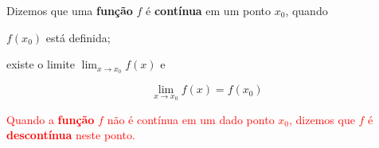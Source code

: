 \cleardoublepage\documentclass[../main.tex]{subfiles}
\begin{document}
\begin{framed}\begin{definition}
Dizemos que uma {\bf função} $f$ é {\bf contínua} em um ponto $x_0$, quando 
\begin{compactenum}[(i)]
\item $f(x_0)$ está definida;
\item existe o limite $\displaystyle \lim_{x\to x_0} f(x)$ e
\item \begin{equation*}
  \lim_{x\to x_0} f(x) = f(x_0)
\end{equation*}
\end{compactenum}
\end{definition}\end{framed}

 \textcolor{red}{Quando a {\bf função} $f$ não é contínua em um dado ponto $x_0$, dizemos que $f$ é {\bf descontínua} neste ponto.}\\
\end{document}
